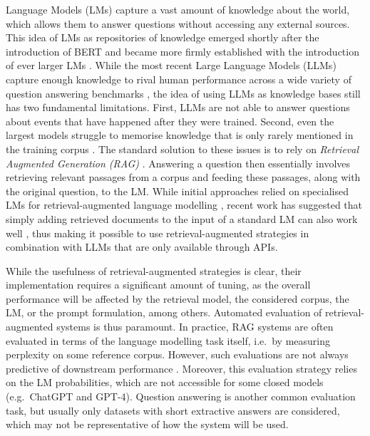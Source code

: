 \documentclass[11pt]{article}
\begin{document}
Language Models (LMs) capture a vast amount of knowledge about the world, which allows them to answer questions without accessing any external sources. This idea of LMs as repositories of knowledge emerged shortly after the introduction of BERT \cite{devlin-etal-2019-bert} and became more firmly established with the introduction of ever larger LMs \cite{roberts-etal-2020-much}. While the most recent Large Language Models (LLMs) capture enough knowledge to rival human performance across a wide variety of question answering benchmarks \cite{bubeck2023sparks}, the idea of using LLMs as knowledge bases still has two fundamental limitations. First, LLMs are not able to answer questions about events that have happened after they were trained. Second, even the largest models struggle to memorise knowledge that is only rarely mentioned in the training corpus \cite{DBLP:journals/corr/abs-2211-08411,mallen-etal-2023-trust}. The standard solution to these issues is to rely on \emph{Retrieval Augmented Generation (RAG)} \cite{lee2019latent,DBLP:conf/nips/LewisPPPKGKLYR020,guu2020retrieval}. Answering a question then essentially involves retrieving relevant passages from a corpus and feeding these passages, along with the original question, to the LM. While initial approaches relied on specialised LMs for retrieval-augmented language modelling \cite{DBLP:conf/iclr/KhandelwalLJZL20,DBLP:conf/icml/BorgeaudMHCRM0L22}, recent work has suggested that simply adding retrieved documents to the input of a standard LM can also work well \cite{DBLP:journals/corr/abs-2212-14024,DBLP:journals/corr/abs-2302-00083,DBLP:journals/corr/abs-2301-12652}, thus making it possible to use retrieval-augmented strategies in combination with LLMs that are only available through APIs.

While the usefulness of retrieval-augmented strategies is clear, their implementation requires a significant amount of tuning, as the overall performance will be affected by the retrieval model, the considered corpus, the LM, or the prompt formulation, among others. Automated evaluation of retrieval-augmented systems is thus paramount. In practice, RAG systems are often evaluated in terms of the language modelling task itself, i.e.\ by measuring perplexity on some reference corpus. However, such evaluations are not always predictive of downstream performance \cite{DBLP:journals/corr/abs-2305-14625}. Moreover, this evaluation strategy relies on the LM probabilities, which are not accessible for some closed models (e.g.\ ChatGPT and GPT-4). Question answering is another common evaluation task, but usually only datasets with short extractive answers are considered, which may not be representative of how the system will be used.  
\end{document}
